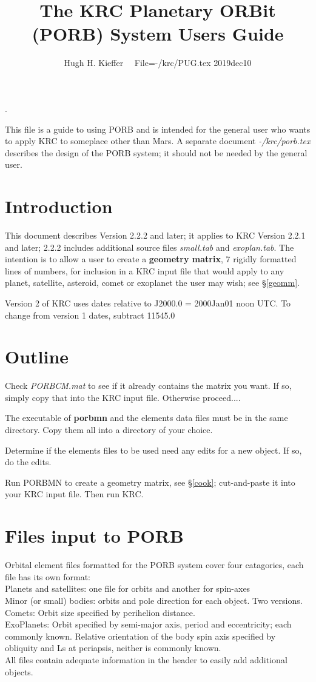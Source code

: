 \documentclass{article}
\title{The KRC Planetary ORBit (PORB) System Users Guide}
\author{Hugh H. Kieffer  \ \ File=-/krc/PUG.tex 2019dec10}
\newcommand{\np}{\textbf}  %
\newcommand{\nf}{\textit}  %
\newcommand{\qi}{\\ \hspace*{2.em}}      %
\begin{document}
\maketitle
\tableofcontents
\hrulefill .\hrulefill

This file is a guide to using PORB and is intended for the general user who
wants to apply KRC to someplace other than Mars.  A separate document
\nf{-/krc/porb.tex} describes the design of the PORB system; it should not be
needed by the general user.

\section{Introduction} 
This document describes Version 2.2.2 and later; it applies to KRC Version 2.2.1
and later; 2.2.2 includes additional source files \nf{small.tab} and
\nf{exoplan.tab}. The intention is to allow a user to create a \textbf{geometry
  matrix}, 7 rigidly formatted lines of numbers, for inclusion in a KRC input
file that would apply to any planet, satellite, asteroid, comet or exoplanet the
user may wish; see \S \ref{geomm}.

Version 2 of KRC uses dates relative to J2000.0 = 2000Jan01 noon UTC. To change
from version 1 dates, subtract 11545.0

\section{Outline}

Check \nf{PORBCM.mat} to see if it already contains the matrix you want. If so, simply copy that into the KRC input file. Otherwise proceed....

The executable of \np{porbmn} and the elements data files must be in the same directory. Copy them all into a directory of your choice.

Determine if the elements files to be used need any edits for a new object.
 If so, do the edits.

Run PORBMN to create a geometry matrix, see \S \ref{cook}; cut-and-paste it into your KRC input
file. Then run KRC.

\section{Files input to PORB} %
Orbital element files formatted for the PORB system cover four catagories, each file has its own format:
\qi Planets and satellites:  one file for orbits and another for spin-axes
\qi Minor (or small) bodies: orbits and pole direction for each object. Two versions.
\qi Comets: Orbit size specified by perihelion distance. 
\qi ExoPlanets: Orbit specified by semi-major axis, period and eccentricity; each commonly known. Relative orientation of the body spin axis specified by obliquity and Ls at periapsis, neither is commonly known.
\\ All files contain adequate information in the header to easily add additional objects.
\end{document}
